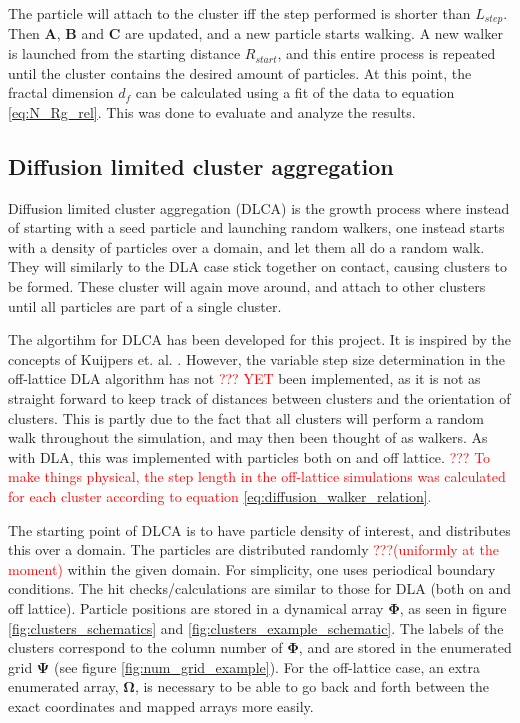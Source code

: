 The particle will attach to the cluster iff the step performed is shorter than $L_{step}$. Then $\textbf{A}$, $\textbf{B}$ and $\textbf{C}$ are updated, and a new particle starts walking. A new walker is launched from the starting distance $R_{start}$, and this entire process is repeated until the cluster contains the desired amount of particles. At this point, the fractal dimension $d_f$ can be calculated using a fit of the data to equation \eqref{eq:N_Rg_rel}. This was done to evaluate and analyze the results.

\subsection{Diffusion limited cluster aggregation}
\label{sec:DLCA}
Diffusion limited cluster aggregation (DLCA) is the growth process where instead of starting with a seed particle and launching random walkers, one instead starts with a density of particles over a domain, and let them all do a random walk. They will similarly to the DLA case stick together on contact, causing clusters to be formed. These cluster will again move around, and attach to other clusters until all particles are part of a single cluster. 

The algortihm for DLCA has been developed for this project. It is inspired by the concepts of Kuijpers et. al. \cite{Kuijpers2014841}. However, the variable step size determination in the off-lattice DLA algorithm has not \textcolor{red}{??? YET} been implemented, as it is not as straight forward to keep track of distances between clusters and the orientation of clusters. This is partly due to the fact that all clusters will perform a random walk throughout the simulation, and may then been thought of as walkers. As with DLA, this was implemented with particles both on and off lattice. \textcolor{red}{??? To make things physical, the step length in the off-lattice simulations was calculated for each cluster according to equation \eqref{eq:diffusion_walker_relation}.}

The starting point of DLCA is to have particle density of interest, and distributes this over a domain. The particles are distributed randomly \textcolor{red}{???(uniformly at the moment)} within the given domain. For simplicity, one uses periodical boundary conditions. The hit checks/calculations are similar to those for DLA (both on and off lattice). Particle positions are stored in a dynamical array $\mathbf{\Phi}$, as seen in figure \ref{fig:clusters_schematics} and \ref{fig:clusters_example_schematic}. The labels of the clusters correspond to the column number of $\mathbf{\Phi}$, and are stored in the enumerated grid $\mathbf{\Psi}$ (see figure \ref{fig:num_grid_example}). For the off-lattice case, an extra enumerated array, $\mathbf{\Omega}$, is necessary to be able to go back and forth between the exact coordinates and mapped arrays more easily.


